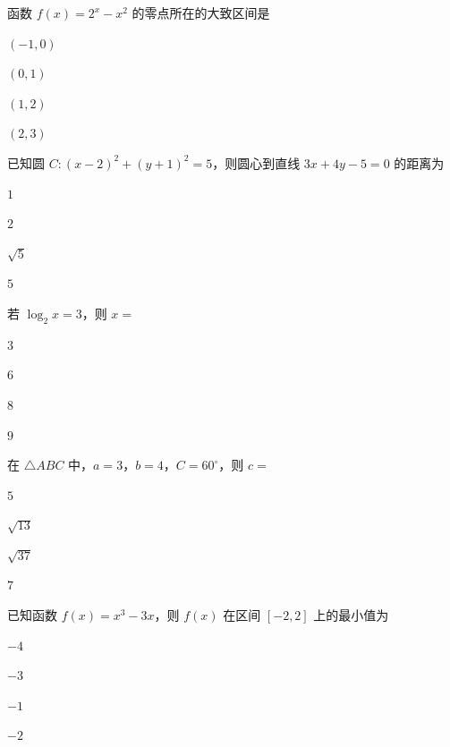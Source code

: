 \documentclass{exam-zh}
\begin{document}
\begin{question}
  函数 $f(x) = 2^x - x^2$ 的零点所在的大致区间是\paren[C]
  \begin{choices}
    \item $(-1, 0)$
    \item $(0, 1)$
    \item $(1, 2)$
    \item $(2, 3)$
  \end{choices}
\end{question}

\begin{question}
  已知圆 $C: (x - 2)^2 + (y + 1)^2 = 5$，则圆心到直线 $3x + 4y - 5 = 0$ 的距离为\paren[A]
  \begin{choices}
    \item $1$
    \item $2$
    \item $\sqrt{5}$
    \item $5$
  \end{choices}
\end{question}

\begin{question}
  若 $\log_2 x = 3$，则 $x = $ \paren[C]
  \begin{choices}
    \item $3$
    \item $6$
    \item $8$
    \item $9$
  \end{choices}
\end{question}

\begin{question}
  在 $\triangle ABC$ 中，$a = 3$，$b = 4$，$C = 60^\circ$，则 $c = $ \paren[B]
  \begin{choices}
    \item $5$
    \item $\sqrt{13}$
    \item $\sqrt{37}$
    \item $7$
  \end{choices}
\end{question}

\begin{question}
  已知函数 $f(x) = x^3 - 3x$，则 $f(x)$ 在区间 $[-2, 2]$ 上的最小值为\paren[D]
  \begin{choices}
    \item $-4$
    \item $-3$
    \item $-1$
    \item $-2$
  \end{choices}
\end{question}
\end{document}
